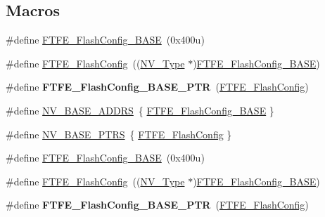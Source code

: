 \subsection*{Macros}
\begin{DoxyCompactItemize}
\item 
\#define \hyperlink{group__NV__Peripheral__Access__Layer_ga10dc635084032a61ca68e3d242e3aaf0}{F\+T\+F\+E\+\_\+\+Flash\+Config\+\_\+\+B\+A\+SE}~(0x400u)
\item 
\#define \hyperlink{group__NV__Peripheral__Access__Layer_ga834657fb01c008d200d4e0aaa7857a2f}{F\+T\+F\+E\+\_\+\+Flash\+Config}~((\hyperlink{structNV__Type}{N\+V\+\_\+\+Type} $\ast$)\hyperlink{group__NV__Peripheral__Access__Layer_ga10dc635084032a61ca68e3d242e3aaf0}{F\+T\+F\+E\+\_\+\+Flash\+Config\+\_\+\+B\+A\+SE})
\item 
\#define {\bfseries F\+T\+F\+E\+\_\+\+Flash\+Config\+\_\+\+B\+A\+S\+E\+\_\+\+P\+TR}~(\hyperlink{group__NV__Peripheral__Access__Layer_ga834657fb01c008d200d4e0aaa7857a2f}{F\+T\+F\+E\+\_\+\+Flash\+Config})\hypertarget{group__NV__Peripheral__Access__Layer_ga824c84d1d5dcc180128d85f4f676b4c5}{}\label{group__NV__Peripheral__Access__Layer_ga824c84d1d5dcc180128d85f4f676b4c5}

\item 
\#define \hyperlink{group__NV__Peripheral__Access__Layer_ga59a94e9ecd6653c2a47bc205a8c0ba4c}{N\+V\+\_\+\+B\+A\+S\+E\+\_\+\+A\+D\+D\+RS}~\{ \hyperlink{group__NV__Peripheral__Access__Layer_ga10dc635084032a61ca68e3d242e3aaf0}{F\+T\+F\+E\+\_\+\+Flash\+Config\+\_\+\+B\+A\+SE} \}
\item 
\#define \hyperlink{group__NV__Peripheral__Access__Layer_ga1e44e66a8945b675dcebb6fbd6bdc85b}{N\+V\+\_\+\+B\+A\+S\+E\+\_\+\+P\+T\+RS}~\{ \hyperlink{group__NV__Peripheral__Access__Layer_ga834657fb01c008d200d4e0aaa7857a2f}{F\+T\+F\+E\+\_\+\+Flash\+Config} \}
\item 
\#define \hyperlink{group__NV__Peripheral__Access__Layer_ga10dc635084032a61ca68e3d242e3aaf0}{F\+T\+F\+E\+\_\+\+Flash\+Config\+\_\+\+B\+A\+SE}~(0x400u)
\item 
\#define \hyperlink{group__NV__Peripheral__Access__Layer_ga834657fb01c008d200d4e0aaa7857a2f}{F\+T\+F\+E\+\_\+\+Flash\+Config}~((\hyperlink{structNV__Type}{N\+V\+\_\+\+Type} $\ast$)\hyperlink{group__NV__Peripheral__Access__Layer_ga10dc635084032a61ca68e3d242e3aaf0}{F\+T\+F\+E\+\_\+\+Flash\+Config\+\_\+\+B\+A\+SE})
\item 
\#define {\bfseries F\+T\+F\+E\+\_\+\+Flash\+Config\+\_\+\+B\+A\+S\+E\+\_\+\+P\+TR}~(\hyperlink{group__NV__Peripheral__Access__Layer_ga834657fb01c008d200d4e0aaa7857a2f}{F\+T\+F\+E\+\_\+\+Flash\+Config})\hypertarget{group__NV__Peripheral__Access__Layer_ga824c84d1d5dcc180128d85f4f676b4c5}{}\label{group__NV__Peripheral__Access__Layer_ga824c84d1d5dcc180128d85f4f676b4c5}


\end{DoxyCompactItemize}
